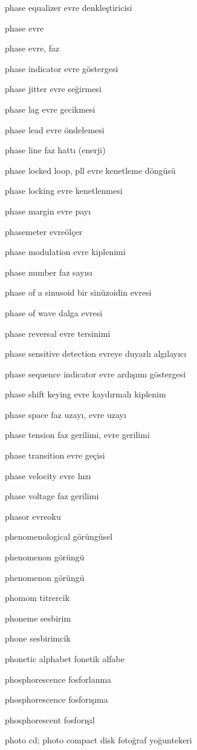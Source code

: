 \documentclass[12pt,fleqn]{article}\usepackage{../../common}
\begin{document}
phase equalizer evre denkleştiricisi

phase evre

phase evre, faz

phase indicator evre göstergesi

phase jitter evre seğirmesi

phase lag evre gecikmesi

phase lead evre öndelemesi

phase line faz hattı (enerji)

phase locked loop, pll evre kenetleme döngüsü

phase locking evre kenetlenmesi

phase margin evre payı

phasemeter evreölçer

phase modulation evre kiplenimi

phase number faz sayısı

phase of a sinusoid bir sinüzoidin evresi

phase of wave dalga evresi

phase reversal evre tersinimi

phase sensitive detection evreye duyarlı algılayıcı

phase sequence indicator evre ardışımı göstergesi

phase shift keying evre kaydırmalı kiplenim

phase space faz uzayı, evre uzayı

phase tension faz gerilimi, evre gerilimi

phase transition evre geçisi

phase velocity evre hızı

phase voltage faz gerilimi

phasor evreoku

phenomenological görüngüsel

phenomenon görüngü

phenomenon görüngü

phomom titrercik

phoneme sesbirim

phone sesbirimcik

phonetic alphabet fonetik alfabe

phosphorescence fosforlanma

phosphorescence fosforışıma

phosphorescent fosforışıl

photo cd; photo compact disk fotoğraf yoğuntekeri
\end{document}
